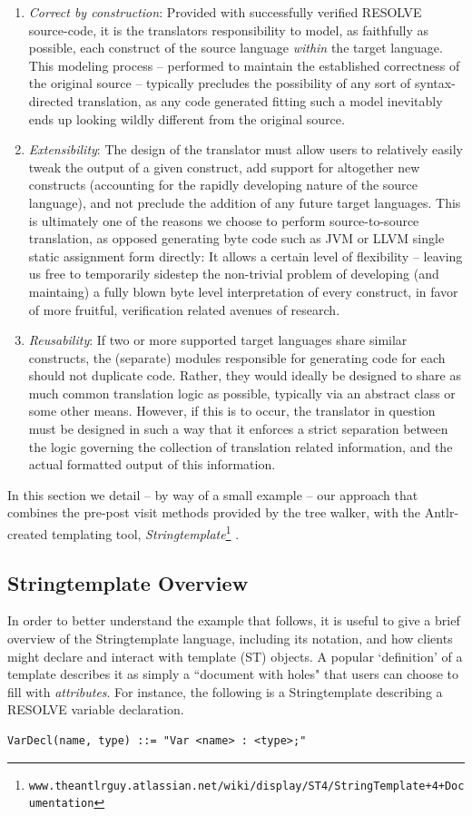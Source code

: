 \documentclass[times]{speauth}
\begin{document}
\begin{enumerate}
\item \textit{Correct by construction}: Provided with successfully verified RESOLVE source-code, it is the translators responsibility to model, as faithfully as possible, each construct of the source language \textit{within} the target language. This modeling process -- performed to maintain the established correctness of the original source -- typically precludes the possibility of any sort of syntax-directed translation, as any code generated fitting such a model inevitably ends up looking wildly different from the original source.
\item \textit{Extensibility}: The design of the translator must allow users to relatively easily tweak the output of a given construct, add support for altogether new constructs (accounting for the rapidly developing nature of the source language), and not preclude the addition of any future target languages. This is ultimately one of the reasons we choose to perform source-to-source translation, as opposed generating byte code such as JVM or LLVM single static assignment form directly: It allows a certain level of flexibility -- leaving us free to temporarily sidestep the non-trivial problem of developing (and maintaing) a fully blown byte level interpretation of every construct, in favor of more fruitful, verification related avenues of research.
\item \textit{Reusability}: If two or more supported target languages share similar constructs, the (separate) modules responsible for generating code for each should not duplicate code. Rather, they would ideally be designed to share as much common translation logic as possible, typically via an abstract class or some other means. However, if this is to occur, the translator in question must be designed in such a way that it enforces a strict separation between the logic governing the collection of translation related information, and the actual formatted output of this information.
\end{enumerate}

In this section we detail -- by way of a small example -- our approach that combines the pre-post visit methods provided by the tree walker, with the Antlr-created templating tool, \textit{Stringtemplate}\footnote[3]{\texttt{www.theantlrguy.atlassian.net/wiki/display/ST4/StringTemplate+4+Documentation}} \cite{parr:2006}.

\subsection{Stringtemplate Overview}
In order to better understand the example that follows, it is useful to give a brief overview of the Stringtemplate language, including its notation, and how clients might declare and interact with template (ST) objects. A popular `definition' of a template describes it as simply a ``document with holes" that users can choose to fill with \textit{attributes}. For instance, the following is a Stringtemplate describing a RESOLVE variable declaration.
\begin{lstlisting}
VarDecl(name, type) ::= "Var <name> : <type>;"
\end{lstlisting}
\end{document}
